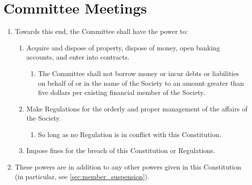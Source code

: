 \documentclass[a4paper]{article}
\newenvironment{enumsection}[1]{\section{#1} \begin{enumerate}[ref=\thesection.\theenumi]}{\end{enumerate}}
\begin{document}
\begin{enumsection}{Committee Meetings}
    \item Towards this end, the Committee shall have the power to:
    \begin{enumerate}
        \item Acquire and dispose of property, dispose of money, open banking accounts, and enter into contracts.
        \begin{enumerate}
            \item The Committee shall not borrow money or incur debts or liabilities on behalf of or in the name of the Society to an amount greater than five dollars per existing financial member of the Society.
        \end{enumerate}
        \item Make Regulations for the orderly and proper management of the affairs of the Society.
        \begin{enumerate}
            \item So long as no Regulation is in conflict with this Constitution.
        \end{enumerate}
        \item Impose fines for the breach of this Constitution or Regulations.
    \end{enumerate}
    \item These powers are in addition to any other powers given in this Constitution (in particular, see \cref{sec:member_suspension}).
\end{enumsection}
\end{document}
